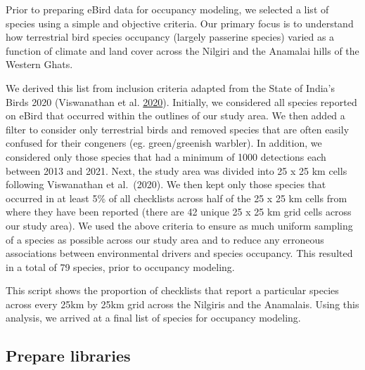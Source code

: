 \documentclass[
]{article}
\begin{document}
Prior to preparing eBird data for occupancy modeling, we selected a list of species using a simple and objective criteria. Our primary focus is to understand how terrestrial bird species occupancy (largely passerine species) varied as a function of climate and land cover across the Nilgiri and the Anamalai hills of the Western Ghats.

We derived this list from inclusion criteria adapted from the State of India's Birds 2020 (Viswanathan et al. \protect\hyperlink{ref-viswanathan2020}{2020}). Initially, we considered all species reported on eBird that occurred within the outlines of our study area. We then added a filter to consider only terrestrial birds and removed species that are often easily confused for their congeners (eg. green/greenish warbler). In addition, we considered only those species that had a minimum of 1000 detections each between 2013 and 2021. Next, the study area was divided into 25 x 25 km cells following Viswanathan et al.~(2020). We then kept only those species that occurred in at least 5\% of all checklists across half of the 25 x 25 km cells from where they have been reported (there are 42 unique 25 x 25 km grid cells across our study area). We used the above criteria to ensure as much uniform sampling of a species as possible across our study area and to reduce any erroneous associations between environmental drivers and species occupancy. This resulted in a total of 79 species, prior to occupancy modeling.

This script shows the proportion of checklists that report a particular species across every 25km by 25km grid across the Nilgiris and the Anamalais. Using this analysis, we arrived at a final list of species for occupancy modeling.

\hypertarget{prepare-libraries}{%
\subsection{Prepare libraries}\label{prepare-libraries}}
\end{document}
